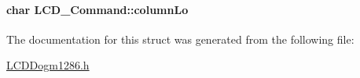 \paragraph[{column\-Lo}]{\setlength{\rightskip}{0pt plus 5cm}char L\-C\-D\-\_\-\-Command\-::column\-Lo}\label{struct_l_c_d___command_adaf735a3cc75a92e5b8bbc51d7bf2975}


The documentation for this struct was generated from the following file\-:\begin{DoxyCompactItemize}
\item 
\hyperlink{_l_c_d_dogm1286_8h}{L\-C\-D\-Dogm1286.\-h}\end{DoxyCompactItemize}
